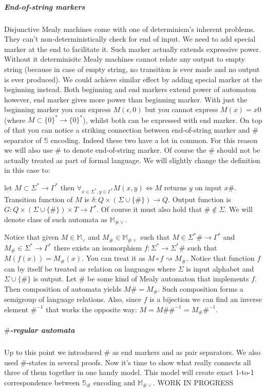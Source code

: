 \documentclass[12pt]{article}
\begin{document}
\subparagraph{End-of-string markers} Disjunctive Mealy machines come with one of determinism's inherent problems. They can't non-deterministically check for end of input. We need to add special marker at the end to facilitate it. Such marker  actually extends expressive power. Without it determinisitc Mealy machines cannot relate any output to empty string (because in case of empty string, no transition is ever made and no output is ever produced). We could achieve similar effect by adding special marker at the beginning instead. Both beginning and end markers extend power of automaton however, end  marker gives more power than beginning marker. With just the beginning marker you can express $M(\epsilon,0)$ but you cannot express $M(x) = x0$ (where $M \subset \{0\}^* \rightarrow \{0\}^*$), whilst both can be expressed with end marker. On top of that you can notice a striking connection between end-of-string marker and $\#$ separator of $\mathbb{S}$ encoding. Indeed these two have a lot in common. For this reason we will also use $\#$ to denote end-of-string marker. Of course the $\#$ should not be actually treated as part  of formal language. We will slightly change the definition in this case to:


let $M\subset \Sigma^* \rightarrow \Gamma^*$ then $\forall_{x\in \Sigma^*,y\in\Gamma^*} M(x,y) \iff M$ returns $y$ on input $x\#$. Transition function of $M$ is $\delta : Q \times (\Sigma \cup \{\#\}) \rightarrow Q$. Output function is $G : Q \times (\Sigma \cup \{\#\}) \times T \rightarrow \Gamma^*$. Of course it must also hold that $\# \notin \Sigma$. We will denote class of such automata as $\mathbb{M}_{\#\vee}$.

Notice that given $M \in \mathbb{M}_\vee$ and $M_\# \in \mathbb{M}_{\#\vee}$ such that $M \in \Sigma^*\# \rightarrow \Gamma^*$ and $M_\# \in \Sigma^* \rightarrow \Gamma^*$ there exists an isomorphism $f : \Sigma^* \rightarrow \Sigma^*\#$ such that $M(f(x)) = M_\#(x)$. You can treat it as $M \circ f \rightsquigarrow M_\#$. Notice that function $f$ can by itself be treated as relation on languages where $\Sigma$ is input alphabet and $\Sigma\cup\{\#\}$ is output. Let $\#$ be some kind of Mealy automaton that implements $f$. Then composition of automata yields $M\# = M_\#$. Such composition forms a semigroup of language relations. Also, since $f$ is a bijection we can find an inverse element $\#^{-1}$ that works the opposite way:  $M = M\#\#^{-1} = M_\#\#^{-1}$.


\subparagraph{$\#$-regular automata}Up to this point we introduced $\#$ as end markers and as pair separators. We also used $\#$-states in several proofs. Now it's time to show what really connects all three of them together in one handy model. This model will create exact 1-to-1 correspondence between $\mathbb{S}_\#$ encoding and $\mathbb{M}_{\#\vee}$. WORK IN PROGRESS
\end{document}
